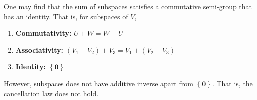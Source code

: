 \documentclass[../main.tex]{subfiles}
\begin{document}
\begin{remark}
One may find that the sum of subspaces satisfies a commutative semi-group that has an identity. That is, for subspaces of $V$, 
\begin{enumerate}
	\item \textbf{Commutativity: } $U+W=W+U$ 
	\item \textbf{Associativity: } $(V_1+V_2)+V_3 = V_1+(V_2+V_3)$
	\item \textbf{Identity: } $\left\{ \boldsymbol{0} \right\}$
\end{enumerate}

However, subspaces does not have additive inverse apart from $\left\{ \boldsymbol{0} \right\}$. That is, the cancellation law does not hold.
\end{remark}
\end{document}
